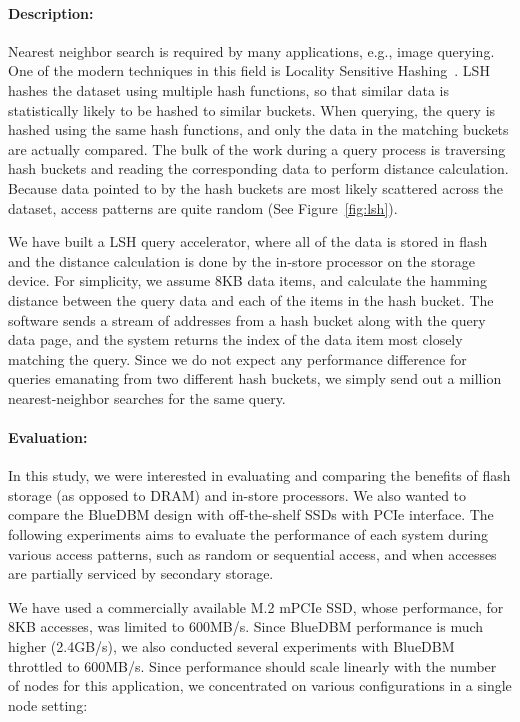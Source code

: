 \paragraph{Description:}
Nearest neighbor search is required by many applications, e.g., image querying. One of
the modern techniques in this field is Locality Sensitive Hashing~\cite{lsh}.
LSH hashes the dataset using multiple hash functions, so that
similar data is statistically likely to be hashed to similar buckets. When
querying, the query is hashed using the same hash functions, and only the data
in the matching buckets are actually compared. The bulk of the work during a
query process is traversing hash buckets and reading the corresponding data to
perform distance calculation. Because data pointed to by the hash buckets are
most likely scattered across the dataset, access patterns are quite random (See Figure~\ref{fig:lsh}).




We have built a LSH query accelerator, where all of the data is stored in flash
and the distance calculation is done by the in-store processor on the storage
device. For simplicity, we assume 8KB data items, and calculate the hamming
distance between the query data and each of the items in the hash bucket. The
software sends a stream of addresses from a hash bucket along with the query
data page, and the system returns the index of the data item most closely matching the
query. Since we do not expect any performance difference for queries emanating from two different hash buckets, we simply send out a million nearest-neighbor searches for the same query.

\paragraph{Evaluation:}
In this study, we were interested in evaluating and comparing the benefits of
flash storage (as opposed to DRAM) and in-store processors.  We also wanted to
compare the BlueDBM design with off-the-shelf SSDs with PCIe interface. The
following experiments aims to evaluate the performance of each system during
various access patterns, such as random or sequential access, and when accesses
are partially serviced by secondary storage.

We have used a commercially available M.2 mPCIe SSD, whose performance, for 8KB
accesses, was limited to 600MB/s. Since BlueDBM performance is much higher
(2.4GB/s), we also conducted several experiments with BlueDBM throttled to
600MB/s. Since performance should scale linearly with the number of nodes for
this application, we concentrated on various configurations in a single node
setting:

